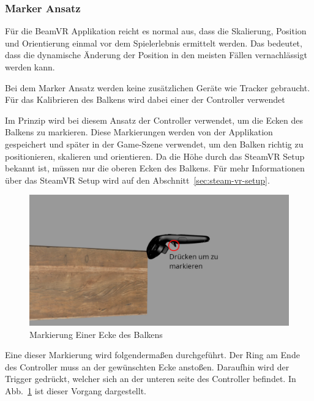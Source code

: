 \subsubsection{Marker Ansatz}

Für die BeamVR Applikation reicht es normal aus, dass die Skalierung, Position und Orientierung einmal vor dem Spielerlebnis ermittelt werden.
Das bedeutet, dass die dynamische Änderung der Position in den meisten Fällen vernachlässigt werden kann.

Bei dem Marker Ansatz werden keine zusätzlichen Geräte wie Tracker gebraucht.
Für das Kalibrieren des Balkens wird dabei einer der Controller verwendet

Im Prinzip wird bei diesem Ansatz der Controller verwendet, um die Ecken des Balkens zu markieren.
Diese Markierungen werden von der Applikation gespeichert und später in der Game-Szene verwendet, um den Balken richtig zu positionieren, skalieren und orientieren.
Da die Höhe durch das SteamVR Setup bekannt ist, müssen nur die oberen Ecken des Balkens.
Für mehr Informationen über das SteamVR Setup wird auf den Abschnitt~\ref{sec:steam-vr-setup}.

\begin{figure}
    \centering
    \includegraphics[scale=0.3]{pics/beam_mark}
    \caption{Markierung Einer Ecke des Balkens}
    \label{fig:beam-mark}
\end{figure}

Eine dieser Markierung wird folgendermaßen durchgeführt.
Der Ring am Ende des Controller muss an der gewünschten Ecke anstoßen.
Daraufhin wird der Trigger gedrückt, welcher sich an der unteren seite des Controller befindet.
In Abb.~\ref{fig:beam-mark} ist dieser Vorgang dargestellt.

